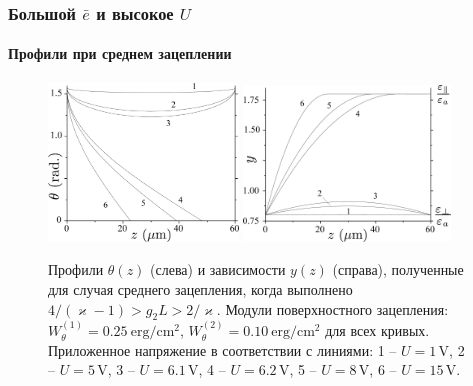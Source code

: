 \documentclass[utf8,secheader]{beamer}
\begin{document}
\begin{frame}
\frametitle{Большой $\bar{e}$ и высокое $U$}
\framesubtitle{Профили при среднем зацеплении}
\begin{figure}[h]
\includegraphics[width=0.45\textwidth]{Fig2_theta_mid_anchoring.eps}%
\includegraphics[width=0.49\textwidth]{Fig2_y_mid_anchoring.eps}
\caption{\footnotesize Профили $\theta(z)$ (слева) и зависимости $y(z)$ (справа), полученные для случая среднего зацепления, когда выполнено $4/(\varkappa - 1)> g_2 L > 2/\varkappa$. Модули поверхностного зацепления: $W_\theta^{(1)}=0.25\ \mathrm{erg}/\mathrm{cm}^2$, $W_\theta^{(2)} = 0.10\ \mathrm{erg}/\mathrm{cm}^2$ для всех кривых. Приложенное напряжение в соответствии с линиями: 1 -- $U = 1\,\mathrm{V}$, 2 -- $U = 5\,\mathrm{V}$, 3 -- $U = 6.1\,\mathrm{V}$, 4 -- $U = 6.2\,\mathrm{V}$, 5 -- $U = 8\,\mathrm{V}$, 6 -- $U = 15\,\mathrm{V}$.}
\end{figure}
\end{frame}
\end{document}
